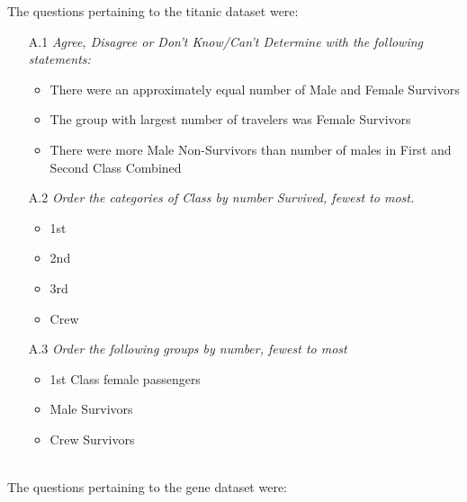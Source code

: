 The questions pertaining to the titanic dataset were: 
\begin{itemize}
\item[A.1]\emph{Agree, Disagree or Don't Know/Can't Determine with the following statements:}
\begin{itemize}
\item There were an approximately equal number of Male and Female Survivors
\item The group with largest number of travelers was Female Survivors
\item There were more Male Non-Survivors than number of males in First and Second Class Combined
\end{itemize}

\item[A.2]\emph{Order the categories of Class by number Survived, fewest to most.} 
\begin{itemize}
\item 1st
\item 2nd 
\item 3rd
\item Crew
\end{itemize}

\item[A.3]\emph{Order the following groups by number, fewest to most}
\begin{itemize}
\item 1st Class female passengers
\item Male Survivors
\item Crew Survivors
\end{itemize}
\end{itemize}


\noindent \\  The questions pertaining to the gene dataset were: 


